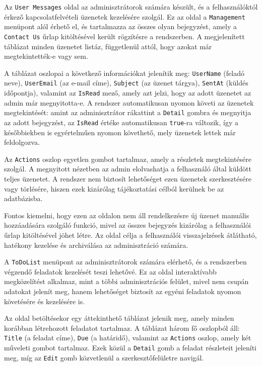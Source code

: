 Az \texttt{User Messages} oldal az adminisztrátorok számára készült, és a felhasználóktól érkező kapcsolatfelvételi üzenetek kezelésére szolgál. Ez az oldal a \texttt{Management} menüpont alól érhető el, és tartalmazza az összes olyan bejegyzést, amely a \texttt{Contact Us} űrlap kitöltésével került rögzítésre a rendszerben. A megjelenített táblázat minden üzenetet listáz, függetlenül attól, hogy azokat már megtekintették-e vagy sem.

A táblázat oszlopai a következő információkat jelenítik meg: \texttt{UserName} (feladó neve), \texttt{UserEmail} (az e-mail címe), \texttt{Subject} (az üzenet tárgya), \texttt{SentAt} (küldés időpontja), valamint az \texttt{IsRead} mező, amely azt jelzi, hogy az adott üzenetet az admin már megnyitotta-e. A rendszer automatikusan nyomon követi az üzenetek megtekintését: amint az adminisztrátor rákattint a \texttt{Detail} gombra és megnyitja az adott bejegyzést, az \texttt{IsRead} értéke automatikusan \texttt{true}-ra változik, így a későbbiekben is egyértelműen nyomon követhető, mely üzenetek lettek már feldolgozva.

Az \texttt{Actions} oszlop egyetlen gombot tartalmaz, amely a részletek megtekintésére szolgál. A megnyitott nézetben az admin elolvashatja a felhasználó által küldött teljes üzenetet. A rendszer nem biztosít lehetőséget ezen üzenetek szerkesztésére vagy törlésére, hiszen ezek kizárólag tájékoztatási célból kerülnek be az adatbázisba.

Fontos kiemelni, hogy ezen az oldalon nem áll rendelkezésre új üzenet manuális hozzáadására szolgáló funkció, mivel az összes bejegyzés kizárólag a felhasználói űrlap kitöltésével jöhet létre. Az oldal célja a felhasználói visszajelzések átlátható, hatékony kezelése és archiválása az adminisztráció számára.

A \texttt{ToDoList} menüpont az adminisztrátorok számára elérhető, és a rendszerben végzendő feladatok kezelését teszi lehetővé. Ez az oldal interaktívabb megközelítést alkalmaz, mint a többi adminisztrációs felület, mivel nem csupán adatokat jelenít meg, hanem lehetőséget biztosít az egyéni feladatok nyomon követésére és kezelésére is.

Az oldal betöltésekor egy áttekinthető táblázat jelenik meg, amely minden korábban létrehozott feladatot tartalmaz. A táblázat három fő oszlopból áll: \texttt{Title} (a feladat címe), \texttt{Due} (a határidő), valamint az \texttt{Actions} oszlop, amely két műveleti gombot tartalmaz. Ezek közül a \texttt{Detail} gomb a feladat részleteit jeleníti meg, míg az \texttt{Edit} gomb közvetlenül a szerkesztőfelületre navigál.


